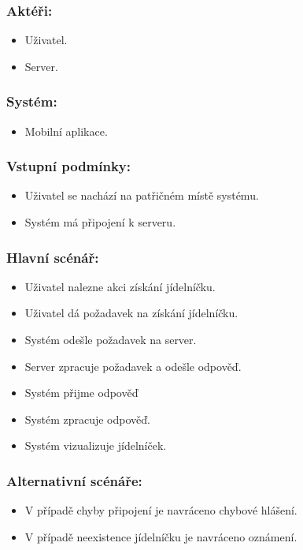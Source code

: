 \subsubsection*{Aktéři:}
\begin{itemize}
 \item Uživatel.
 \item Server.
\end{itemize}
\subsubsection*{Systém:}
\begin{itemize}
 \item Mobilní aplikace.
\end{itemize}
\subsubsection*{Vstupní podmínky:}
\begin{itemize}
 \item Uživatel se nachází na patřičném místě systému.
 \item Systém má připojení k serveru.
\end{itemize}
\subsubsection*{Hlavní scénář:}
\begin{itemize}
 \item Uživatel nalezne akci získání jídelníčku.
 \item Uživatel dá požadavek na získání jídelníčku.
 \item Systém odešle požadavek na server.
 \item Server zpracuje požadavek a odešle odpověď.
 \item Systém přijme odpověď
 \item Systém zpracuje odpověď.
 \item Systém vizualizuje jídelníček.
\end{itemize}
\subsubsection*{Alternativní scénáře:}
\begin{itemize}
 \item V případě chyby připojení je navráceno chybové hlášení.
 \item V případě neexistence jídelníčku je navráceno oznámení.
\end{itemize}

